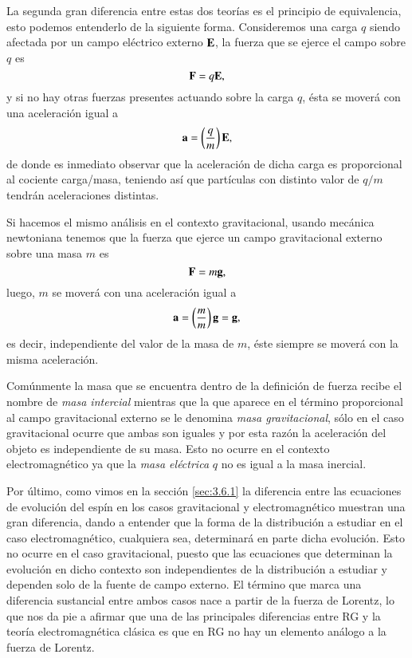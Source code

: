 La segunda gran diferencia entre estas dos teorías es el principio de equivalencia, esto podemos entenderlo de la siguiente forma. Consideremos una carga $q$ siendo afectada por un campo eléctrico externo $\vb{E}$, la fuerza que se ejerce el campo sobre $q$ es
\begin{equation}
\vb{F} = q \vb{E},
\end{equation}
y si no hay otras fuerzas presentes actuando sobre la carga $q$, ésta se moverá con una aceleración igual a
\begin{equation}
\vb{a} = \left( \frac{q}{m} \right) \vb{E},
\end{equation}
de donde es inmediato observar que la aceleración de dicha carga es proporcional al cociente carga/masa, teniendo así que partículas con  distinto valor de $q/m$ tendrán aceleraciones distintas.

Si hacemos el mismo análisis en el contexto gravitacional, usando mecánica newtoniana tenemos que la fuerza que ejerce un campo gravitacional externo sobre una masa $m$ es
\begin{equation}
\label{eq:67}
\vb{F} = m \vb{g},
\end{equation}
luego, $m$ se moverá con una aceleración igual a
\begin{equation}
\vb{a} = \left( \frac{m}{m} \right) \vb{g} = \vb{g},
\end{equation}
es decir, independiente del valor de la masa de $m$, éste siempre se moverá con la misma aceleración. 

Comúnmente la masa que se encuentra dentro de la definición de fuerza recibe el nombre de \textit{masa intercial} mientras que la que aparece en el término proporcional al campo gravitacional externo se le denomina \textit{masa gravitacional}, sólo en el caso gravitacional ocurre que ambas son iguales y por esta razón la aceleración del objeto es independiente de su masa. Esto no ocurre en el contexto electromagnético ya que la \textit{masa eléctrica} $q$ no es igual a la masa inercial.

Por último, como vimos en la sección \ref{sec:3.6.1} la diferencia entre las ecuaciones de evolución del espín en los casos gravitacional y electromagnético muestran una gran diferencia, dando a entender que la forma de la distribución a estudiar en el caso electromagnético, cualquiera sea, determinará en parte dicha evolución. Esto no ocurre en el caso gravitacional, puesto que las ecuaciones que determinan la evolución en dicho contexto son independientes de la distribución a estudiar y dependen solo de la fuente de campo externo. El término que marca una diferencia sustancial entre ambos casos nace a partir de la fuerza de Lorentz, lo que nos da pie a afirmar que una de las principales diferencias entre RG y la teoría electromagnética clásica es que en RG no hay un elemento análogo a la fuerza de Lorentz.